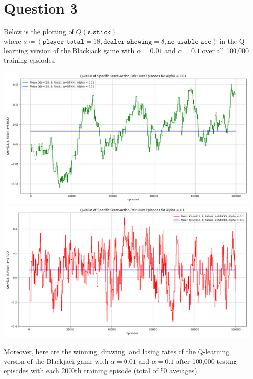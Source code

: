 \documentclass{article}
\begin{document}
\section*{Question 3}
Below is the plotting of $Q(\texttt{s,stick})$\\ 
where $s\coloneq(\texttt{player total} = 18, \texttt{dealer showing} = 8, \texttt{no usable ace})$
in the Q-learning version of the Blackjack game with $\alpha = 0.01$ and $\alpha=0.1$ over all 100,000 training epsiodes.
\begin{center}
    \includegraphics[scale=0.4]{Q_Blackjack_Alpha_0.01.png}
    \includegraphics[scale=0.4]{Q_Blackjack_Alpha_0.1.png}
\end{center}\par 
Moreover, here are the winning, drawing, and losing rates of the Q-learning version of the Blackjack game with $\alpha = 0.01$ and $\alpha=0.1$ after 100,000 testing episodes with each 2000th training episode (total of 50 averages).
\end{document}
